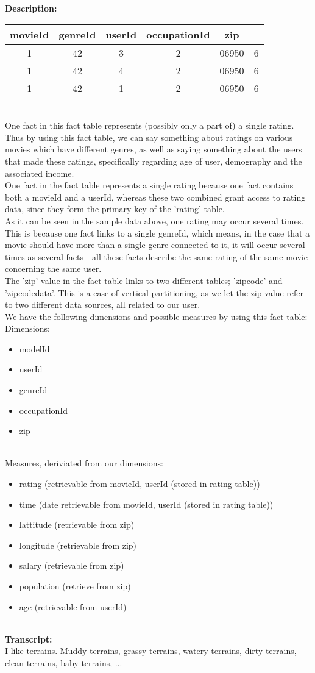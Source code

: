 \textbf{Description:} \\
\begin{tabular}{ c | c | c | c | c | c }
  movieId & genreId & userId & occupationId & zip \\
  \hline
  1 & 42 & 3 & 2 & 06950 & 6 \\
  1 & 42 & 4 & 2 & 06950 & 6 \\
  1 & 42 & 1 & 2 & 06950 & 6 \\
  \hline  
\end{tabular} \\
\noindent One fact in this fact table represents (possibly only a part of) a single rating. Thus by using this fact table, we can say something about ratings on various movies which have different genres, as well as saying something about the users that made these ratings, specifically regarding age of user, demography and the associated income. \\
One fact in the fact table represents a single rating because one fact contains both a movieId and a userId, whereas these two combined grant access to rating data, since they form the primary key of the 'rating' table. \\
As it can be seen in the sample data above, one rating may occur several times. This is because one fact links to a single genreId, which means, in the case that a movie should have more than a single genre connected to it, it will occur several times as several facts - all these facts describe the same rating of the same movie concerning the same user. \\
The 'zip' value in the fact table links to two different tables; 'zipcode' and 'zipcodedata'. This is a case of vertical partitioning, as we let the zip value refer to two different data sources, all related to our user. \\

\noindent We have the following dimensions and possible measures by using this fact table: \\
Dimensions:
\begin{itemize}
  \item modelId
  \item userId
  \item genreId
  \item occupationId
  \item zip
\end{itemize} \\
Measures, deriviated from our dimensions:
\begin{itemize}
  \item rating (retrievable from movieId, userId (stored in rating table))
  \item time (date retrievable from movieId, userId (stored in rating table))
  \item lattitude (retrievable from zip)
  \item longitude (retrievable from zip)
  \item salary (retrievable from zip)
  \item population (retrieve from zip)
  \item age (retrievable from userId)
\end{itemize} \\

\textbf{Transcript:} \\
I like terrains.
Muddy terrains, grassy terrains, watery terrains, dirty terrains, clean terrains, baby terrains, ...
